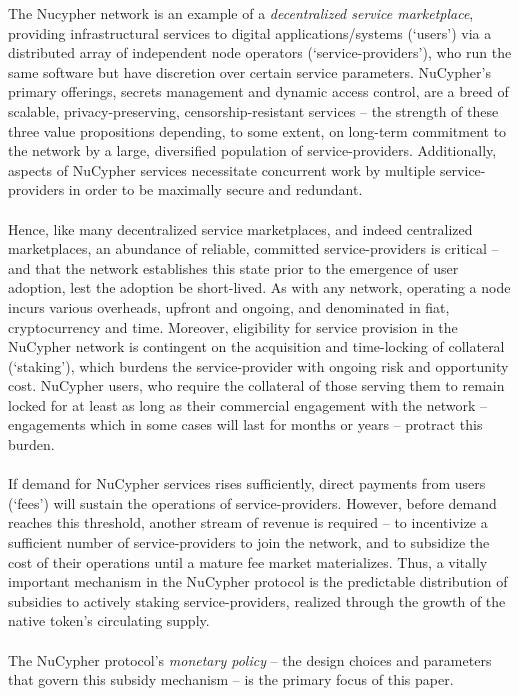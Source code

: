 \documentclass[longbibliography,nofootinbib]{revtex4-1}
\begin{document}
The Nucypher network is an example of a \textit{decentralized service marketplace}, providing infrastructural services to digital applications/systems (`users') via a distributed array of independent node operators (`service-providers'), who run the same software but have discretion over certain service parameters. NuCypher's primary offerings, secrets management and dynamic access control, are a breed of scalable, privacy-preserving, censorship-resistant services – the strength of these three value propositions depending, to some extent, on long-term commitment to the network by a large, diversified population of service-providers. Additionally, aspects of NuCypher services necessitate concurrent work by multiple service-providers in order to be maximally secure and redundant.
\\\\
Hence, like many decentralized service marketplaces, and indeed centralized marketplaces, an abundance of reliable, committed service-providers is critical – and that the network establishes this state prior to the emergence of user adoption, lest the adoption be short-lived. As with any network, operating a node incurs various overheads, upfront and ongoing, and denominated in fiat, cryptocurrency and time. Moreover, eligibility for service provision in the NuCypher network is contingent on the acquisition and time-locking of collateral (`staking'), which burdens the service-provider with ongoing risk and opportunity cost. NuCypher users, who require the collateral of those serving them to remain locked for at least as long as their commercial engagement with the network – engagements which in some cases will last for months or years – protract this burden.
\\\\
If demand for NuCypher services rises sufficiently, direct payments from users (`fees') will sustain the operations of service-providers. However, before demand reaches this threshold, another stream of revenue is required – to incentivize a sufficient number of service-providers to join the network, and to subsidize the cost of their operations until a mature fee market materializes. Thus, a vitally important mechanism in the NuCypher protocol is the predictable distribution of subsidies to actively staking service-providers, realized through the growth of the native token's circulating supply. 
\\\\
The NuCypher protocol's \textit{monetary policy} – the design choices and parameters that govern this subsidy mechanism – is the primary focus of this paper. 
\end{document}
